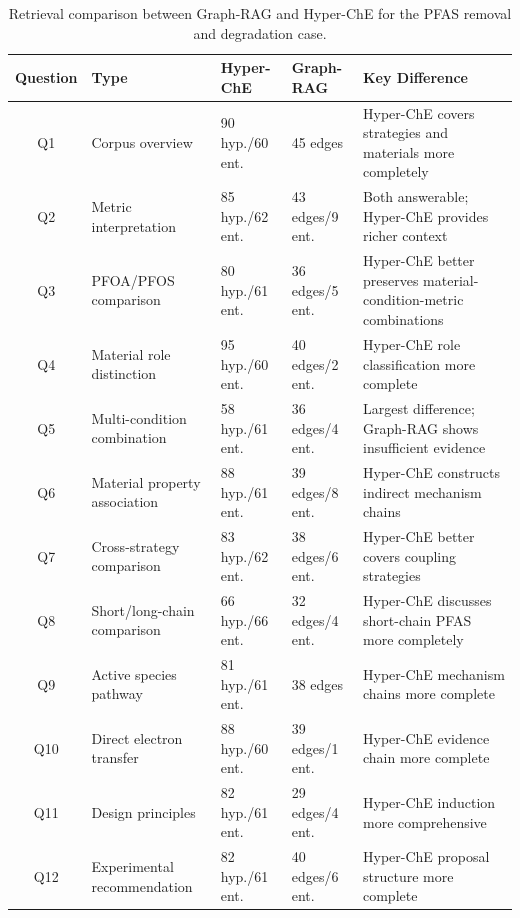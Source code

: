 \documentclass[11pt,a4paper]{article}
\begin{document}
\begin{table}[htbp]
\centering
\caption{Retrieval comparison between Graph-RAG and Hyper-ChE for the PFAS removal and degradation case.}
\label{tab:pfas_retrieval_comparison}
\begin{tabular}{@{}cllll@{}}
\toprule
\textbf{Question} & \textbf{Type} & \textbf{Hyper-ChE} & \textbf{Graph-RAG} & \textbf{Key Difference} \\
\midrule
Q1 & Corpus overview & 90 hyp./60 ent. & 45 edges & Hyper-ChE covers strategies and materials more completely \\
Q2 & Metric interpretation & 85 hyp./62 ent. & 43 edges/9 ent. & Both answerable; Hyper-ChE provides richer context \\
Q3 & PFOA/PFOS comparison & 80 hyp./61 ent. & 36 edges/5 ent. & Hyper-ChE better preserves material-condition-metric combinations \\
Q4 & Material role distinction & 95 hyp./60 ent. & 40 edges/2 ent. & Hyper-ChE role classification more complete \\
Q5 & Multi-condition combination & 58 hyp./61 ent. & 36 edges/4 ent. & Largest difference; Graph-RAG shows insufficient evidence \\
Q6 & Material property association & 88 hyp./61 ent. & 39 edges/8 ent. & Hyper-ChE constructs indirect mechanism chains \\
Q7 & Cross-strategy comparison & 83 hyp./62 ent. & 38 edges/6 ent. & Hyper-ChE better covers coupling strategies \\
Q8 & Short/long-chain comparison & 66 hyp./66 ent. & 32 edges/4 ent. & Hyper-ChE discusses short-chain PFAS more completely \\
Q9 & Active species pathway & 81 hyp./61 ent. & 38 edges & Hyper-ChE mechanism chains more complete \\
Q10 & Direct electron transfer & 88 hyp./60 ent. & 39 edges/1 ent. & Hyper-ChE evidence chain more complete \\
Q11 & Design principles & 82 hyp./61 ent. & 29 edges/4 ent. & Hyper-ChE induction more comprehensive \\
Q12 & Experimental recommendation & 82 hyp./61 ent. & 40 edges/6 ent. & Hyper-ChE proposal structure more complete \\
\bottomrule
\end{tabular}
\end{table}
\end{document}
